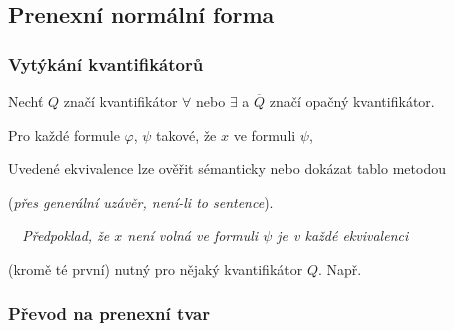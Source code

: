 
\subsection{Prenexní normální forma}\todo

\subsubsection*{Vytýkání kvantifikátorů}
    Nechť $Q$ značí kvantifikátor $\forall$ nebo $\exists$ a $\overline{Q}$ značí opačný kvantifikátor.
    \smallskip
    
    Pro každé formule $\varphi$, $\psi$ takové, že $x$  ve formuli $\psi$,
    \vspace{-1mm}
    
    \vspace{-4mm}
    Uvedené ekvivalence lze ověřit sémanticky nebo dokázat tablo metodou
    \smallskip
    
    (\emph{přes generální uzávěr, není-li to sentence}).
    \bigskip
    
    
    {\it {}\ \ Předpoklad, že $x$ není volná ve formuli $\psi$ je v každé ekvivalenci
    \smallskip
    
    (kromě té první) nutný pro nějaký kvantifikátor $Q$. Např.}
    \vspace{-1mm}
    
    \vspace{-6mm}
    
    
    
    \subsubsection*{Převod na prenexní tvar}
    
